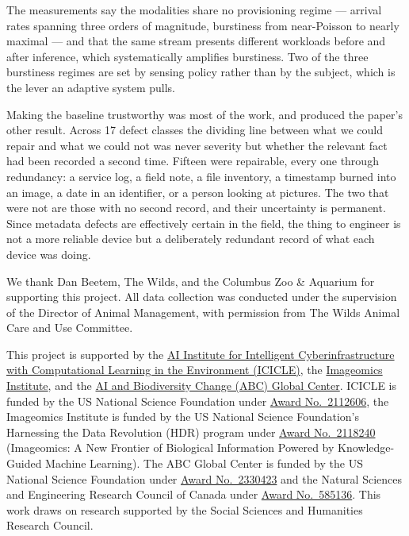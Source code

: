\documentclass[sigconf]{acmart}
\begin{document}
The measurements say the modalities share no provisioning regime ---
arrival rates spanning three orders of magnitude, burstiness from
near-Poisson to nearly maximal --- and that the same stream presents
different workloads before and after inference, which systematically
amplifies burstiness. Two of the three burstiness regimes are set by
sensing policy rather than by the subject, which is the lever an
adaptive system pulls.

Making the baseline trustworthy was most of the work, and produced the
paper's other result. Across 17 defect classes the dividing line between
what we could repair and what we could not was never severity but
whether the relevant fact had been recorded a second time. Fifteen were
repairable, every one through redundancy: a service log, a field note, a
file inventory, a timestamp burned into an image, a date in an
identifier, or a person looking at pictures. The two that were not are
those with no second record, and their uncertainty is permanent. Since
metadata defects are effectively certain in the field, the thing to
engineer is not a more reliable device but a deliberately redundant
record of what each device was doing.

\begin{acks}
We thank Dan Beetem, The Wilds, and the Columbus Zoo \& Aquarium for
supporting this project. All data collection was conducted under the
supervision of the Director of Animal Management, with permission from
The Wilds Animal Care and Use Committee.

This project is supported by the \href{https://icicle.osu.edu/}{AI
Institute for Intelligent Cyberinfrastructure with Computational
Learning in the Environment (ICICLE)}, the
\href{https://imageomics.org/}{Imageomics Institute}, and the
\href{http://abcresearchcenter.org/}{AI and Biodiversity Change (ABC)
Global Center}. ICICLE is funded by the US National Science Foundation
under
\href{https://www.nsf.gov/awardsearch/showAward?AWD_ID=2112606}{Award
No.\ 2112606}, the Imageomics Institute is funded by the US National
Science Foundation's Harnessing the Data Revolution (HDR) program under
\href{https://www.nsf.gov/awardsearch/showAward?AWD_ID=2118240}{Award
No.\ 2118240} (Imageomics: A New Frontier of Biological Information
Powered by Knowledge-Guided Machine Learning). The ABC Global Center is
funded by the US National Science Foundation under
\href{https://www.nsf.gov/awardsearch/showAward?AWD_ID=2330423&HistoricalAwards=false}{Award
No.\ 2330423} and the Natural Sciences and Engineering Research Council
of Canada under
\href{https://www.nserc-crsng.gc.ca/ase-oro/Details-Detailles_eng.asp?id=782440}{Award
No.\ 585136}. This work draws on research supported by the Social
Sciences and Humanities Research Council.
\end{acks}
\end{document}

